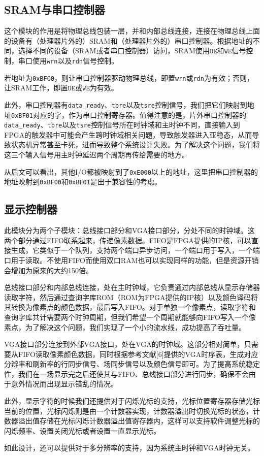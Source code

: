\documentclass[11pt,utf8]{report}
\begin{document}
\subsection{SRAM与串口控制器}
	\par 这个模块的作用是将物理总线包装一层，并和内部总线连接，连接在物理总线上面的设备有（处理器片外的）SRAM和（处理器片外的）串口控制器。根据地址的不同，选择不同的设备（SRAM或者串口控制器）访问，SRAM使用\texttt{$\mathtt{\overline{OE}}\mbox{和}\mathtt{\overline{WE}}$}信号控制，串口使用\texttt{wrn}以及\texttt{rdn}信号控制。
	\par 若地址为\texttt{0xBF00}，则让串口控制器驱动物理总线，即置\texttt{wrn}或\texttt{rdn}为有效；否则，让SRAM工作，即置\texttt{$\mathtt{\overline{OE}}\mbox{或}\mathtt{\overline{WE}}$}为有效。
	
	\par 此外，串口控制器有\texttt{data\_ready}、\texttt{tbre}以及\texttt{tsre}控制信号，我们把它们映射到地址\texttt{0xBF01}对应的字，作为串口控制寄存器。值得注意的是，片外串口控制器的\texttt{data\_ready}、\texttt{tbre}以及\texttt{tsre}控制信号所在时钟域和主时钟不同，直接输入到FPGA的触发器中可能会产生跨时钟域相关问题，导致触发器进入亚稳态，从而导致状态机异常甚至卡死，进而导致整个系统设计失败。为了解决这个问题，我们将这三个输入信号用主时钟延迟两个周期再传给需要的地方。
	
	\par 从后文可以看出，其他I/O都被映射到了\texttt{0xE000}以上的地址，这里把串口控制器的地址映射到\texttt{0xBF00}和\texttt{0xBF01}是出于兼容性的考虑。

\subsection{显示控制器}
	\par 此模块分为两个子模块：总线接口部分和VGA接口部分，分处不同的时钟域。这两个部分通过FIFO联系起来，传递像素数据。FIFO是FPGA提供的IP核，可以直接生成，它类似于一个队列，支持两个端口异步访问，一个端口用于写入，一个端口用于读取。不使用FIFO而使用双口RAM也可以实现同样的功能，但是资源开销会增加为原来的大约150倍。
	\par 总线接口部分和内部总线连接，处在主时钟域，它负责通过内部总线从显示存储器读取字符，然后通过查询字库ROM（ROM为FPGA提供的IP核）以及颜色译码将其转换为像素点的颜色数据，最后写入FIFO。对于单独一个像素点，读取字符和查询字库共计需要两个时钟周期，但我们希望一个周期就能够向FIFO写入一个像素点，为了解决这个问题，我们实现了一个小的流水线，成功提高了吞吐量。
	\par VGA接口部分连接到外部VGA接口，处在VGA的时钟域。这部分相对简单，只需要从FIFO读取像素颜色数据，同时根据参考文献[6]提供的VGA时序表，生成对应分辨率和刷新率的行同步信号、场同步信号以及颜色信号即可。为了提高系统稳定性，我们在一场显示完之后还使其与FIFO、总线接口部分进行同步，确保不会由于意外情况而出现显示错乱的情况。
	\par 此外，显示字符的时候我们还提供对于闪烁光标的支持，光标位置寄存器存储光标当前的位置，光标闪烁则是由一个计数器实现，计数器溢出时切换光标的状态，计数器溢出值存储在光标闪烁计数器溢出值寄存器内，这样可以支持软件调整光标的闪烁频率、设置关闭光标或者设置一直显示光标。
	\par 如此设计，还可以提供对于多分辨率的支持，因为系统主时钟和VGA时钟无关。
\end{document}
